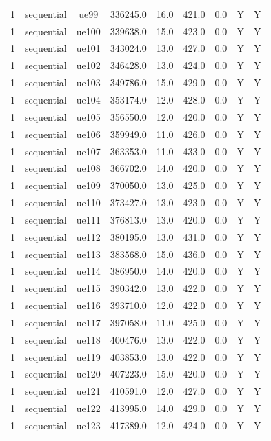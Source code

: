 \begin{table}[ht]
\begin{tabular}{|c|c|c|c|c|c|c|c|c|}
1 & sequential & ue99 & 336245.0 & 16.0 & 421.0 & 0.0 & Y & Y \\
1 & sequential & ue100 & 339638.0 & 15.0 & 423.0 & 0.0 & Y & Y \\
1 & sequential & ue101 & 343024.0 & 13.0 & 427.0 & 0.0 & Y & Y \\
1 & sequential & ue102 & 346428.0 & 13.0 & 424.0 & 0.0 & Y & Y \\
1 & sequential & ue103 & 349786.0 & 15.0 & 429.0 & 0.0 & Y & Y \\
1 & sequential & ue104 & 353174.0 & 12.0 & 428.0 & 0.0 & Y & Y \\
1 & sequential & ue105 & 356550.0 & 12.0 & 420.0 & 0.0 & Y & Y \\
1 & sequential & ue106 & 359949.0 & 11.0 & 426.0 & 0.0 & Y & Y \\
1 & sequential & ue107 & 363353.0 & 11.0 & 433.0 & 0.0 & Y & Y \\
1 & sequential & ue108 & 366702.0 & 14.0 & 420.0 & 0.0 & Y & Y \\
1 & sequential & ue109 & 370050.0 & 13.0 & 425.0 & 0.0 & Y & Y \\
1 & sequential & ue110 & 373427.0 & 13.0 & 423.0 & 0.0 & Y & Y \\
1 & sequential & ue111 & 376813.0 & 13.0 & 420.0 & 0.0 & Y & Y \\
1 & sequential & ue112 & 380195.0 & 13.0 & 431.0 & 0.0 & Y & Y \\
1 & sequential & ue113 & 383568.0 & 15.0 & 436.0 & 0.0 & Y & Y \\
1 & sequential & ue114 & 386950.0 & 14.0 & 420.0 & 0.0 & Y & Y \\
1 & sequential & ue115 & 390342.0 & 13.0 & 422.0 & 0.0 & Y & Y \\
1 & sequential & ue116 & 393710.0 & 12.0 & 422.0 & 0.0 & Y & Y \\
1 & sequential & ue117 & 397058.0 & 11.0 & 425.0 & 0.0 & Y & Y \\
1 & sequential & ue118 & 400476.0 & 13.0 & 422.0 & 0.0 & Y & Y \\
1 & sequential & ue119 & 403853.0 & 13.0 & 422.0 & 0.0 & Y & Y \\
1 & sequential & ue120 & 407223.0 & 15.0 & 420.0 & 0.0 & Y & Y \\
1 & sequential & ue121 & 410591.0 & 12.0 & 427.0 & 0.0 & Y & Y \\
1 & sequential & ue122 & 413995.0 & 14.0 & 429.0 & 0.0 & Y & Y \\
1 & sequential & ue123 & 417389.0 & 12.0 & 424.0 & 0.0 & Y & Y \\

\end{tabular}
\end{table}
